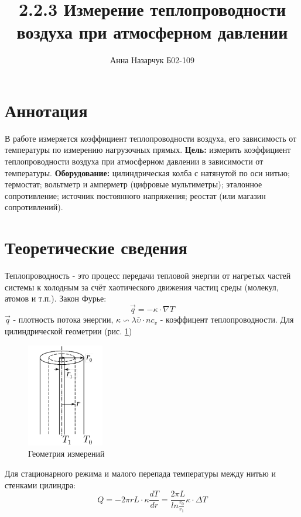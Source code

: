 \documentclass[a4paper,12pt]{article} %
\author{Анна Назарчук Б02-109}
\title{2.2.3 Измерение теплопроводности воздуха при атмосферном давлении}
\date{}
\begin{document}
\maketitle
\section{Аннотация}
В работе измеряется коэффициент теплопроводности воздуха, его зависимость от температуры по измерению нагрузочных прямых.
\textbf{Цель:} измерить коэффициент теплопроводности воздуха при атмосферном
давлении в зависимости от температуры.
\textbf{Оборудование:} цилиндрическая колба с натянутой по оси нитью; термостат;
вольтметр и амперметр (цифровые мультиметры); эталонное сопротивление; источник
постоянного напряжения; реостат (или магазин сопротивлений).
\section{Теоретические сведения}
Теплопроводность - это процесс передачи тепловой энергии от нагретых
частей системы к холодным за счёт хаотического движения частиц среды (молекул, атомов и т.п.). Закон Фурье:
\begin{equation}
\overrightarrow{q}=-\kappa\cdot \nabla T
\end{equation}
$\overrightarrow{q}$ - плотность потока энергии, $\kappa \backsim \lambda\bar{\upsilon}\cdot nc_v$ - коэффицент теплопроводности.
Для цилиндрической геометрии (рис. \ref{цилиндр})
\begin{figure}[h!]
\begin{center}
\includegraphics[width=0.3\textwidth]{Цилиндр}
\end{center}
\caption{Геометрия измерений} \label{цилиндр}
\end{figure}
Для стационарного режима и малого перепада температуры между нитью и стенками цилиндра:
\begin{equation}
Q = -2\pi r L\cdot \kappa \frac{dT}{dr}=\frac{2\pi L}{ln\frac{r_0}{r_1}}\kappa\cdot \Delta T
\end{equation}
\end{document}
